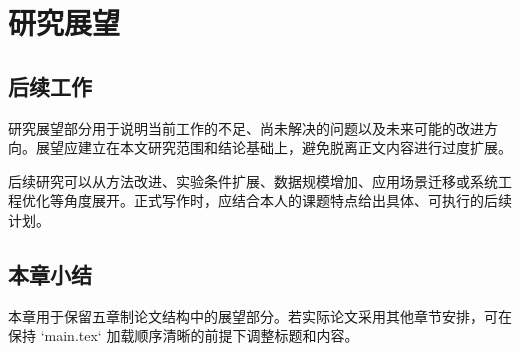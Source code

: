 
\section{研究展望}

\subsection{后续工作}
\thesisbodyfont
研究展望部分用于说明当前工作的不足、尚未解决的问题以及未来可能的改进方向。展望应建立在本文研究范围和结论基础上，避免脱离正文内容进行过度扩展。\par
后续研究可以从方法改进、实验条件扩展、数据规模增加、应用场景迁移或系统工程优化等角度展开。正式写作时，应结合本人的课题特点给出具体、可执行的后续计划。

\subsection{本章小结}
\thesisbodyfont
本章用于保留五章制论文结构中的展望部分。若实际论文采用其他章节安排，可在保持 `main.tex` 加载顺序清晰的前提下调整标题和内容。
